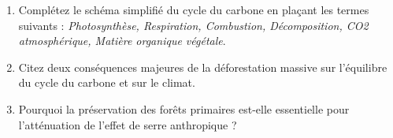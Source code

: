 \documentclass[11pt]{article}
\begin{document}
\begin{exercice}
\begin{enumerate}
    \item Complétez le schéma simplifié du cycle du carbone en plaçant les termes suivants : \textit{Photosynthèse, Respiration, Combustion, Décomposition, CO2 atmosphérique, Matière organique végétale}.
    \begin{center}
    \end{center}
    \item Citez deux conséquences majeures de la déforestation massive sur l'équilibre du cycle du carbone et sur le climat.
    \item Pourquoi la préservation des forêts primaires est-elle essentielle pour l'atténuation de l'effet de serre anthropique ?
\end{enumerate}
\end{exercice}
\end{document}

